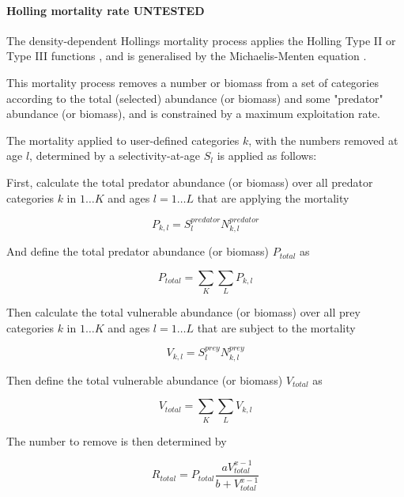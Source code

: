 \paragraph{Holling mortality rate UNTESTED}

The density-dependent Hollings mortality process applies the Holling Type II or Type III functions \citep{Holling1959}, and is generalised by the Michaelis-Menten equation \citep{MentenMichaelis1913}.

This mortality process removes a number or biomass from a set of categories according to the total (selected) abundance (or biomass) and some "predator" abundance (or biomass), and is constrained by a maximum exploitation rate.

The mortality applied to user-defined categories $k$, with the numbers removed at age $l$, determined by a selectivity-at-age $S_l$ is applied as follows:

First, calculate the total predator abundance (or biomass) over all predator categories $k$ in $1 \ldots K$ and ages $l = 1 \ldots L$ that are applying the mortality

\begin{equation}
	P_{k,l} = S^{predator}_l N^{predator}_{k,l}
\end{equation}

And define the total predator abundance (or biomass) $P_{total}$ as

\begin{equation}
	P_{total}  = \sum\limits_K {\sum\limits_L {P_{k,l}}}
\end{equation}

Then calculate the total vulnerable abundance (or biomass) over all prey categories $k$ in $1 \ldots K$ and ages $l = 1 \ldots L$ that are subject to the mortality

\begin{equation}
	V_{k,l} = S^{prey}_l N^{prey}_{k,l}
\end{equation}

Then define the total vulnerable abundance (or biomass) $V_{total}$ as

\begin{equation}
	V_{total}  = \sum\limits_K {\sum\limits_L {V_{k,l}}}
\end{equation}

The number to remove is then determined by

\begin{equation}
	R_{total} = P_{total} \frac{a  V_{total}^{x-1}}{b + V_{total}^{x-1}}
\end{equation}

